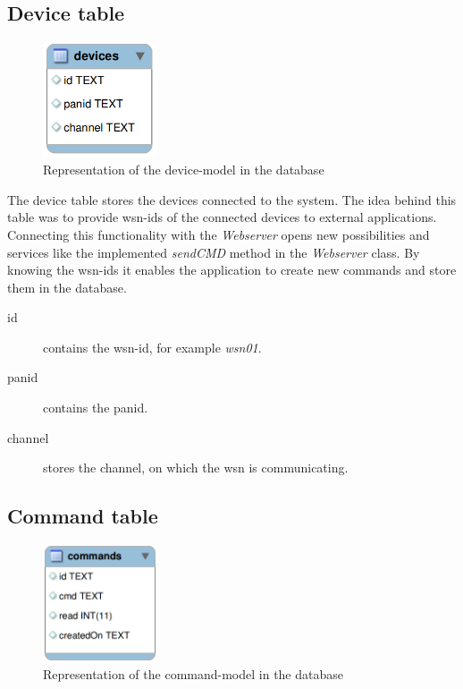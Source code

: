 \newpage
\subsection{Device table}
\begin{figure}[H]
	\centering
	\includegraphics[width=0.3\textwidth]{pic/DatamodelDevices.png}%
    \caption{Representation of the device-model in the database}
    \label{DatamodelDevicespic}%
\end{figure}

The device table stores the devices connected to the system. The idea behind this table was to provide wsn-ids of the connected devices to external applications. Connecting this functionality with the \textit{Webserver} opens new possibilities and services like the implemented \textit{sendCMD} method in the \textit{Webserver} class. By knowing the wsn-ids it enables the application to create new commands and store them in the database.

\begin{description}
	\item[id] contains the wsn-id, for example \textit{wsn01}.
	\item[panid] contains the panid.
	\item[channel] stores the channel, on which the wsn is communicating.
\end{description}

\newpage
\subsection{Command table}
\begin{figure}[H]
	\centering
	\includegraphics[width=0.3\textwidth]{pic/DatamodelCMD.png}%
    \caption{Representation of the command-model in the database}
    \label{DatamodelCMDpic}%
\end{figure}

